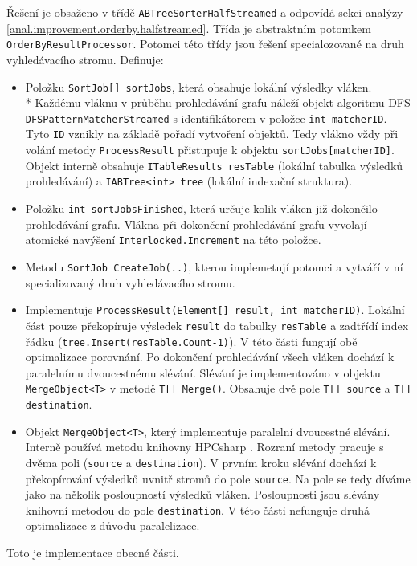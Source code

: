 Řešení je obsaženo v třídě \texttt{ABTreeSorterHalfStreamed} a odpovídá sekci analýzy \ref{anal.improvement.orderby.halfstreamed}.
Třída je abstraktním potomkem \texttt{OrderByResultProcessor}.
Potomci této třídy jsou řešení specialozované na druh vyhledávacího stromu.
Definuje:
\begin{itemize}
\item Položku \texttt{SortJob[] sortJobs}, která obsahuje lokální výsledky vláken. \\*
Každému vláknu v průběhu prohledávání grafu náleží objekt algoritmu DFS \texttt{DFSPatternMatcherStreamed} s identifikátorem v položce \texttt{int matcherID}.
Tyto \texttt{ID} vznikly na základě pořadí vytvoření objektů.
Tedy vlákno vždy při volání metody \texttt{ProcessResult} přistupuje k objektu \texttt{sortJobs[matcherID]}. 
Objekt interně obsahuje \texttt{ITableResults resTable} (lokální tabulka výsledků prohledávání) a \texttt{IABTree<int> tree} (lokální indexační struktura).
\item Položku \texttt{int sortJobsFinished}, která určuje kolik vláken již dokončilo prohledávání grafu.
Vlákna při dokončení prohledávání grafu vyvolají atomické navýšení \texttt{Interlocked.Increment} na této položce.
\item Metodu \texttt{SortJob CreateJob(..)}, kterou implemetují potomci a vytváří v ní specializovaný druh vyhledávacího stromu.
\item Implementuje \texttt{ProcessResult(Element[] result, int matcherID)}.
Lokální část pouze překopíruje výsledek \texttt{result} do tabulky \texttt{resTable} a zadtřídí index řádku (\texttt{tree.Insert(resTable.Count-1)}).
V této části fungují obě optimalizace porovnání.
Po dokončení prohledávání všech vláken dochází k paralelnímu dvoucestnému slévání.
Slévání je implementováno v objektu \texttt{MergeObject<T>} v metodě \texttt{T[] Merge()}.
Obsahuje dvě pole \texttt{T[] source} a \texttt{T[] destination}.
\item Objekt \texttt{MergeObject<T>}, který implementuje paralelní dvoucestné slévání.
Interně používá metodu knihovny HPCsharp \citep{hpcsharp}.
Rozraní metody pracuje s dvěma poli (\texttt{source} a \texttt{destination}).
V prvním kroku slévání dochází k překopírování výsledků uvnitř stromů do pole \texttt{source}.
Na pole se tedy díváme jako na několik posloupností výsledků vláken.
Posloupnosti jsou slévány knihovní metodou do pole \texttt{destination}.
V této části nefunguje druhá optimalizace z důvodu paralelizace.
\end{itemize}
Toto je implementace obecné části.
